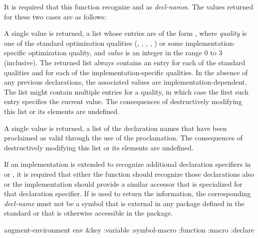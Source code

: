 \begin{newer}
\begin{defun}[Function]
  It is required that this function recognize  and  as
  {\it decl-name\/}s.  The values returned for these two cases are as follows:
\begin{indentdesc}{7pc}
\item[\cdf{optimize}]
A single value is returned,
a list whose entries are of the form , where
                {\it quality} is one of the standard optimization qualities
                (, , , , )
                or some implementation-specific optimization quality, and
                {\it value} is an integer in the range 0 to 3 (inclusive).
                The returned list
                always contains an entry for each of the standard qualities and
                for each of the implementation-specific qualities.  In the
                absence of any previous declarations, the associated values are
                implementation-dependent.  The list might contain multiple
                entries for a quality, in which case the first such entry
                specifies the current value.
                The consequences of destructively modifying this list or
		its elements are undefined.
                

\item[\cdf{declaration}]
A single value is returned,
a list of the declaration names that have been proclaimed as
                valid through the use of the  proclamation.
                The consequences of destructively modifying this list or
		its elements are undefined.
\end{indentdesc}
  If an implementation is extended to recognize additional
  declaration specifiers in  or , it is required that
  either the  function should recognize those
  declarations also or the implementation should provide a similar accessor that is
  specialized for that declaration specifier.  If 
  is used to return the information, the corresponding {\it decl-name} must not
  be a symbol that is external in any package defined in the standard or
  that is otherwise accessible in the  package.
\end{defun}

\begin{defun}[Function]
augment-environment env &key :variable :symbol-macro :function :macro :declare


\end{defun}
\end{newer}
